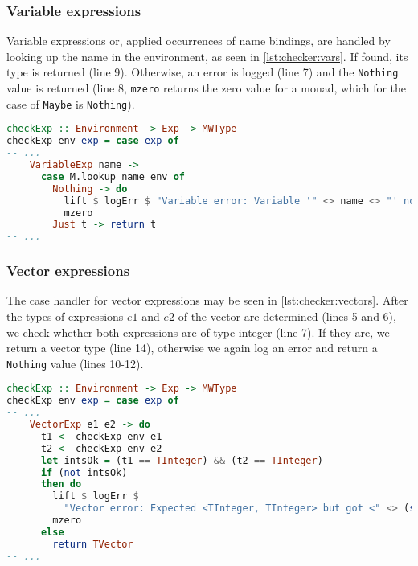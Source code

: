 \subsubsection{Variable expressions}
Variable expressions or, applied occurrences of name bindings, are handled by looking up the name in the environment, as seen in \cref{lst:checker:vars}. If found, its type is returned (line 9). Otherwise, an error is logged (line 7) and the \lstinline{Nothing} value is returned (line 8, \lstinline{mzero} returns the zero value for a monad, which for the case of \lstinline{Maybe} is \lstinline{Nothing}).  

\newpage
\begin{lstlisting}[language=haskell,
caption={Handler for variable expressions},
label=lst:checker:vars]
checkExp :: Environment -> Exp -> MWType
checkExp env exp = case exp of
-- ...
    VariableExp name ->
      case M.lookup name env of
        Nothing -> do
          lift $ logErr $ "Variable error: Variable '" <> name <> "' not in scope."
          mzero
        Just t -> return t
-- ...
\end{lstlisting}

\subsubsection{Vector expressions}
The case handler for vector expressions may be seen in \cref{lst:checker:vectors}. After the types of expressions $e1$ and $e2$ of the vector are determined (lines 5 and 6), we check whether both expressions are of type integer (line 7). If they are, we return a vector type (line 14), otherwise we again log an error and return a \lstinline{Nothing} value (lines 10-12). 
\begin{lstlisting}[language=haskell,
caption={Handler for vector expressions},
label=lst:checker:vectors]
checkExp :: Environment -> Exp -> MWType
checkExp env exp = case exp of
-- ...
    VectorExp e1 e2 -> do
      t1 <- checkExp env e1
      t2 <- checkExp env e2
      let intsOk = (t1 == TInteger) && (t2 == TInteger)
      if (not intsOk)
      then do
        lift $ logErr $
          "Vector error: Expected <TInteger, TInteger> but got <" <> (show t1) <> ", " <> (show t2) <> ">"
        mzero
      else
        return TVector
-- ...
\end{lstlisting}

